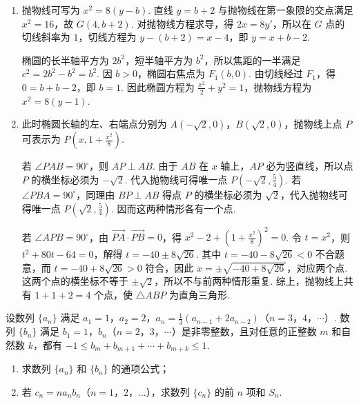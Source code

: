 \begin{solution}
\begin{enumerate}
\item 抛物线可写为 \(x^2=8(y-b)\). 直线 \(y=b+2\) 与抛物线在第一象限的交点满足 \(x^2=16\)，故 \(G(4,b+2)\). 对抛物线方程求导，得 \(2x=8y'\)，所以在 \(G\) 点的切线斜率为 \(1\)，切线方程为 \(y-(b+2)=x-4\)，即 \(y=x+b-2\).

椭圆的长半轴平方为 \(2b^2\)，短半轴平方为 \(b^2\)，所以焦距的一半满足 \(c^2=2b^2-b^2=b^2\). 因 \(b>0\)，椭圆右焦点为 \(F_1(b,0)\). 由切线经过 \(F_1\)，得 \(0=b+b-2\)，即 \(b=1\). 因此椭圆方程为 \(\frac{x^2}{2}+y^2=1\)，抛物线方程为 \(x^2=8(y-1)\).

\item 此时椭圆长轴的左、右端点分别为 \(A(-\sqrt2,0)\)，\(B(\sqrt2,0)\)，抛物线上点 \(P\) 可表示为 \(P\left(x,1+\frac{x^2}{8}\right)\).

若 \(\angle PAB=90^\circ\)，则 \(AP\perp AB\). 由于 \(AB\) 在 \(x\) 轴上，\(AP\) 必为竖直线，所以点 \(P\) 的横坐标必须为 \(-\sqrt2\). 代入抛物线可得唯一点 \(P\left(-\sqrt2,\frac54\right)\). 若 \(\angle PBA=90^\circ\)，同理由 \(BP\perp AB\) 得点 \(P\) 的横坐标必须为 \(\sqrt2\)，代入抛物线可得唯一点 \(P\left(\sqrt2,\frac54\right)\). 因而这两种情形各有一个点.

若 \(\angle APB=90^\circ\)，由 \(\overrightarrow{PA}\cdot\overrightarrow{PB}=0\)，得
\(x^2-2+\left(1+\frac{x^2}{8}\right)^2=0\). 令 \(t=x^2\)，则 \(t^2+80t-64=0\)，解得 \(t=-40\pm8\sqrt{26}\). 其中 \(t=-40-8\sqrt{26}<0\) 不合题意，而 \(t=-40+8\sqrt{26}>0\) 符合，因此 \(x=\pm\sqrt{-40+8\sqrt{26}}\)，对应两个点. 这两个点的横坐标不等于 \(\pm\sqrt2\)，所以不与前两种情形重复. 综上，抛物线上共有 \(1+1+2=4\) 个点，使 \(\triangle ABP\) 为直角三角形.
\end{enumerate}
\end{solution}

\begin{problem}
设数列 \(\{a_n\}\) 满足 \(a_1 = 1\)，\(a_2 = 2\)，\(a_n = \frac{1}{3}(a_{n-1} + 2a_{n-2})\)（\(n = 3\)，\(4\)，\(\cdots\)）. 数列 \(\{b_n\}\) 满足 \(b_1 = 1\)，\(b_n\)（\(n = 2\)，\(3\)，\(\cdots\)）是非零整数，且对任意的正整数 \(m\) 和自然数 \(k\)，都有 \(-1 \leqslant b_m + b_{m+1} + \cdots + b_{m+k} \leqslant 1\).

\begin{enumerate}
\item 求数列 \(\{a_n\}\) 和 \(\{b_n\}\) 的通项公式；
\item 若 \(c_n = na_nb_n\)（\(n = 1\)，\(2\)，\(\dots\)），求数列 \(\{c_n\}\) 的前 \(n\) 项和 \(S_n\).
\end{enumerate}
\end{problem}

